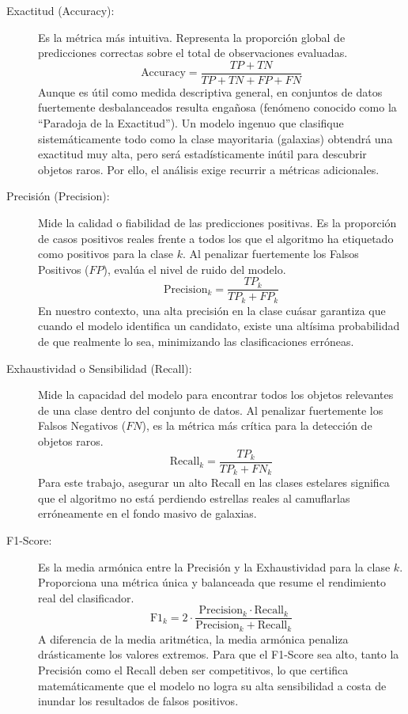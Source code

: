 \documentclass[12pt, a4paper]{report}
\begin{document}
\begin{description}
    \item[Exactitud (Accuracy):] Es la métrica más intuitiva. Representa la proporción global de predicciones correctas sobre el total de observaciones evaluadas.
    \begin{equation}
        \text{Accuracy} = \frac{TP + TN}{TP + TN + FP + FN}
    \end{equation}
    Aunque es útil como medida descriptiva general, en conjuntos de datos fuertemente desbalanceados resulta engañosa (fenómeno conocido como la ``Paradoja de la Exactitud''). Un modelo ingenuo que clasifique sistemáticamente todo como la clase mayoritaria (galaxias) obtendrá una exactitud muy alta, pero será estadísticamente inútil para descubrir objetos raros. Por ello, el análisis exige recurrir a métricas adicionales.

    \item[Precisión (Precision):] Mide la calidad o fiabilidad de las predicciones positivas. Es la proporción de casos positivos reales frente a todos los que el algoritmo ha etiquetado como positivos para la clase $k$. Al penalizar fuertemente los Falsos Positivos ($FP$), evalúa el nivel de ruido del modelo.
    \begin{equation}
        \text{Precision}_k = \frac{TP_k}{TP_k + FP_k}
    \end{equation}
    En nuestro contexto, una alta precisión en la clase cuásar garantiza que cuando el modelo identifica un candidato, existe una altísima probabilidad de que realmente lo sea, minimizando las clasificaciones erróneas.

    \item[Exhaustividad o Sensibilidad (Recall):] Mide la capacidad del modelo para encontrar todos los objetos relevantes de una clase dentro del conjunto de datos. Al penalizar fuertemente los Falsos Negativos ($FN$), es la métrica más crítica para la detección de objetos raros.
    \begin{equation}
        \text{Recall}_k = \frac{TP_k}{TP_k + FN_k}
    \end{equation}
    Para este trabajo, asegurar un alto Recall en las clases estelares significa que el algoritmo no está perdiendo estrellas reales al camuflarlas erróneamente en el fondo masivo de galaxias.

    \item[F1-Score:] Es la media armónica entre la Precisión y la Exhaustividad para la clase $k$. Proporciona una métrica única y balanceada que resume el rendimiento real del clasificador.
    \begin{equation}
        \text{F1}_k = 2 \cdot \frac{\text{Precision}_k \cdot \text{Recall}_k}{\text{Precision}_k + \text{Recall}_k}
    \end{equation}
    A diferencia de la media aritmética, la media armónica penaliza drásticamente los valores extremos. Para que el F1-Score sea alto, tanto la Precisión como el Recall deben ser competitivos, lo que certifica matemáticamente que el modelo no logra su alta sensibilidad a costa de inundar los resultados de falsos positivos.
\end{description}
\end{document}

